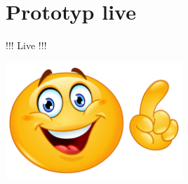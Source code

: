 \documentclass{beamer} %
\begin{document}
%
%






\section[Prototyp ive]{Prototyp live}
\begin{frame}
\begin{center}
\Huge !!! Live !!!
\end{center}
\includegraphics[width=0.5\textwidth]{img/smile-01}
\end{frame}





\end{document}
